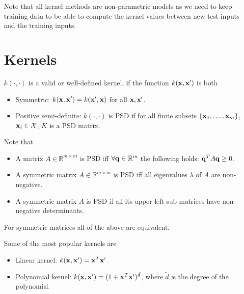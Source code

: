 Note that all kernel methods are non-parametric models as we need to keep training data to be able to compute the kernel values between new test inputs and the training inputs.

\section{Kernels}
\label{sec:kernel:kernel_def}

$k(\cdot, \cdot)$ is a valid or well-defined kernel, if the function $k({\mathbf{x}}, {\mathbf{x}}')$ is both 
\begin{itemize}
	\item Symmetric: $k({\mathbf{x}}, {\mathbf{x}}') = k({\mathbf{x}}', {\mathbf{x}})$ for all ${\mathbf{x}}, {\mathbf{x}}'$.
	\item Positive semi-definite: $k(\cdot, \cdot)$ is PSD if for all finite subsets $\{{\mathbf{x}}_1,\dots,{\mathbf{x}}_m\}$, ${\mathbf{x}}_i\in \mathcal{X}$, $K$ is a PSD matrix. 
\end{itemize}

Note that 
\begin{itemize}
	\item A matrix $A\in \mathbb{R}^{m\times m}$ is PSD iff $\forall {\mathbf{q}}\in \mathbb{R}^m$ the following holds: ${\mathbf{q}}^TA{\mathbf{q}}\geq 0$.
	\item A symmetric matrix $A\in \mathbb{R}^{m\times m}$ is PSD iff all eigenvalues $\lambda$ of $A$ are non-negative. 
	\item A symmetric matrix $A$ is PSD if all its upper left sub-matrices have non-negative determinants.
\end{itemize}

For symmetric matrices all of the above are equivalent. 

Some of the most popular kernels are
\begin{itemize}
	\item Linear kernel: $k({\mathbf{x}}, {\mathbf{x}}') = {\mathbf{x}}^T{\mathbf{x}}'$
	\item Polynomial kernel: $k({\mathbf{x}}, {\mathbf{x}}') = (1+{\mathbf{x}}^T{\mathbf{x}}')^{\tilde{d}}$, where $\tilde{d}$ is the degree of the polynomial
\end{itemize}

